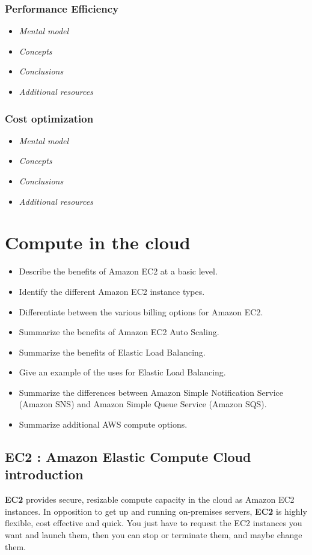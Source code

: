 \documentclass{article}
\theoremstyle{definition}
\begin{document}
\subsubsection{Performance Efficiency}
\begin{itemize}
    \item \textit{Mental model}
    \item \textit{Concepts}
    \item \textit{Conclusions}
    \item \textit{Additional resources}
\end{itemize}

\subsubsection{Cost optimization}
\begin{itemize}
    \item \textit{Mental model}
    \item \textit{Concepts}
    \item \textit{Conclusions}
    \item \textit{Additional resources}
\end{itemize}
\newpage
\section{Compute in the cloud}
\begin{itemize}
\item Describe the benefits of Amazon EC2 at a basic level.
\item Identify the different Amazon EC2 instance types.
\item Differentiate between the various billing options for Amazon EC2.
\item Summarize the benefits of Amazon EC2 Auto Scaling.
\item Summarize the benefits of Elastic Load Balancing.
\item Give an example of the uses for Elastic Load Balancing.
\item Summarize the differences between Amazon Simple Notification Service (Amazon SNS) and Amazon Simple Queue Service (Amazon SQS).
\item Summarize additional AWS compute options.
\end{itemize}

\subsection{EC2 : Amazon Elastic Compute Cloud introduction}
\textbf{EC2} provides secure, resizable compute capacity in the cloud as Amazon EC2 instances.
In opposition to get up and running on-premises servers, \textbf{EC2} is highly flexible, cost effective and quick. You just have to request the EC2 instances you want and launch them, then you can stop or terminate them, and maybe change them.\\
\end{document}
